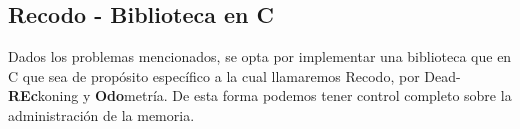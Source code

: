 \documentclass[main.tex]{subfiles}
\begin{document}
\subsection{Recodo - Biblioteca en C}
Dados los problemas mencionados, se opta por implementar una
biblioteca que en C que sea de propósito específico a la cual
llamaremos Recodo, por Dead-\textbf{REc}koning y
\textbf{Odo}metría. De esta forma podemos tener control
completo sobre la administración de la memoria.

\hfill



%
%



%
%
\end{document}

